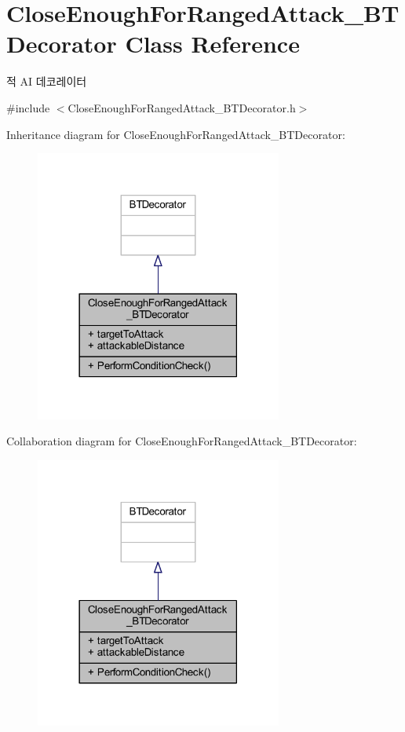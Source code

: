 \hypertarget{class_close_enough_for_ranged_attack___b_t_decorator}{}\section{Close\+Enough\+For\+Ranged\+Attack\+\_\+\+B\+T\+Decorator Class Reference}
\label{class_close_enough_for_ranged_attack___b_t_decorator}


적 AI 데코레이터  




{\ttfamily \#include $<$Close\+Enough\+For\+Ranged\+Attack\+\_\+\+B\+T\+Decorator.\+h$>$}



Inheritance diagram for Close\+Enough\+For\+Ranged\+Attack\+\_\+\+B\+T\+Decorator\+:\nopagebreak
\begin{figure}[H]
\begin{center}
\leavevmode
\includegraphics[width=230pt]{class_close_enough_for_ranged_attack___b_t_decorator__inherit__graph}
\end{center}
\end{figure}


Collaboration diagram for Close\+Enough\+For\+Ranged\+Attack\+\_\+\+B\+T\+Decorator\+:\nopagebreak
\begin{figure}[H]
\begin{center}
\leavevmode
\includegraphics[width=230pt]{class_close_enough_for_ranged_attack___b_t_decorator__coll__graph}
\end{center}
\end{figure}
